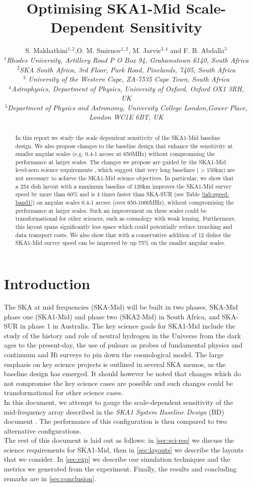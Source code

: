 \documentclass[sfheadings,a4paper,times,9pt,floats,floatfix]{article}
\title{Optimising SKA1-Mid Scale-Dependent Sensitivity}
\author{S. Makhathini$^{1,2}$,O. M. Smirnov$^{1,2}$, M. Jarvis$^{3,4}$ and F. B. Abdalla$^5$ \\{\footnotesize \it $^1$Rhodes
University, Artillery Road P O Box 94, Grahamstown 6140, South Africa} \\{ \footnotesize \it $^2$SKA South Africa, 3rd Floor,
Park Road, Pinelands, 7405, South Africa} \\{\footnotesize \it $^3$ University of the Western Cape, ZA-7535 Cape Town, South
Africa}\\ {\footnotesize \it $^4$Astrophysics, Department of Physics, University of Oxford, Oxford OX1 3RH, UK} \\ {\footnotesize \it $^5$Department of Physics
and Astronomy, University College London,Gower Place, London WC1E 6BT, UK}}
\begin{document}
\maketitle
\begin{abstract}
In this report we study the scale dependent sensitivity of the SKA1-Mid baseline design. We also propose changes to the baseline
design that enhance the sensitivity at smaller angular scales (e.g. 0.4-1 arcsec at 650MHz) without compromising the performance
at larger scales. The changes we propose are guided by the SKA1-Mid level-zero science requirements \cite{srd}, which suggest that
very long baselines ($>150$km) are not necessary to achieve the SKA1-Mid science objectives. In particular, we show that a
254 dish layout with a maximum baseline of 120km improves the SKA1-Mid survey speed by more than 60\% and is 4 times faster than
SKA-SUR (see Table \ref{tab:speed-band1}) on angular scales 0.4-1 arcsec (over 650-1000MHz), without
compromising the performance at larger scales. Such an improvement on these scales could be transformational for other sciences,
such as cosmology with weak lensing. Furthermore, this layout spans significantly less space which could potentially reduce
trenching and data transport costs. We also show that with a conservative addition of 12 dishes the SKA1-Mid survey speed can be
improved by up 75\% on the smaller angular scales.

\end{abstract}
\section{Introduction}
The SKA at mid frequencies (SKA-Mid) will be built in two phases, SKA-Mid phase one (SKA1-Mid) and phase two (SKA2-Mid)
in South Africa, and SKA-SUR in phase 1 in Australia. The key science goals for SKA1-Mid include the study of the history and role
of neutral hydrogen in the Universe from the dark ages to the present-day, the use of pulsars as probes of fundamental physics
\cite{bd} and continuum and H{\sc i} surveys to pin down the cosmological model. The large emphasis on key science
projects is outlined in several SKA memos, as the baseline design has emerged. It should however be noted that changes which do not
compromise the key science cases are possible and such changes could be transformational for other science 
cases. \\ In this document, we attempt to gauge the scale-dependent sensitivity of the mid-frequency array
described in the {\it SKA1 System Baseline Design} (BD) document \cite{bd}. The performance of this configuration is then compared
to two alternative configurations.\\
The rest of this document is laid out as follows: in \autoref{sec:sci-req} we discuss the science requirements for SKA1-Mid, then
in \autoref{sec:layouts} we describe the layouts that we consider. In \autoref{sec:exp} we describe our simulation
techniques and the metrics we generated from the experiment. Finally, the results and concluding remarks are in
\autoref{sec:conclusion}.
\end{document}
